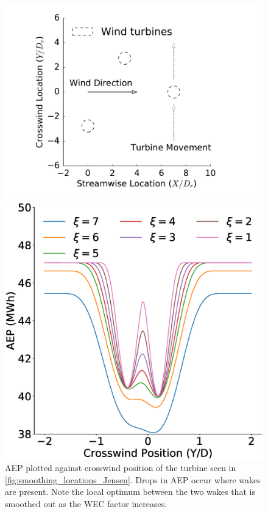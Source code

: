 \documentclass[a4paper]{jpconf}
\begin{document}
\begin{figure}[ht]
	\centering
	\begin{minipage}[t]{0.43\textwidth}
		\centering
		\includegraphics[width=\textwidth, trim={2cm 0cm 2cm 0cm}, clip]{smoothing_locations}
		\caption{Simple design space used to demonstrate the effects of the relaxation factor, $\xi$, on the wind farm layout design space (see \cref{fig:JensenLocalOptSmoothed}).}
		\label{fig:smoothing_locations_Jensen}
	\end{minipage}\hspace{1pc}
	\begin{minipage}[t]{0.52\textwidth}
		\centering
		\includegraphics[width=\textwidth]{JensenWECMultipleTurbinesAEP}
		\caption{AEP plotted against crosswind position of the turbine seen in \cref{fig:smoothing_locations_Jensen}. Drops in AEP occur where wakes are present. Note the local optimum between the two wakes that is smoothed out as the WEC factor increases.}
		\label{fig:JensenLocalOptSmoothed}
	\end{minipage}
\end{figure}
\end{document}
